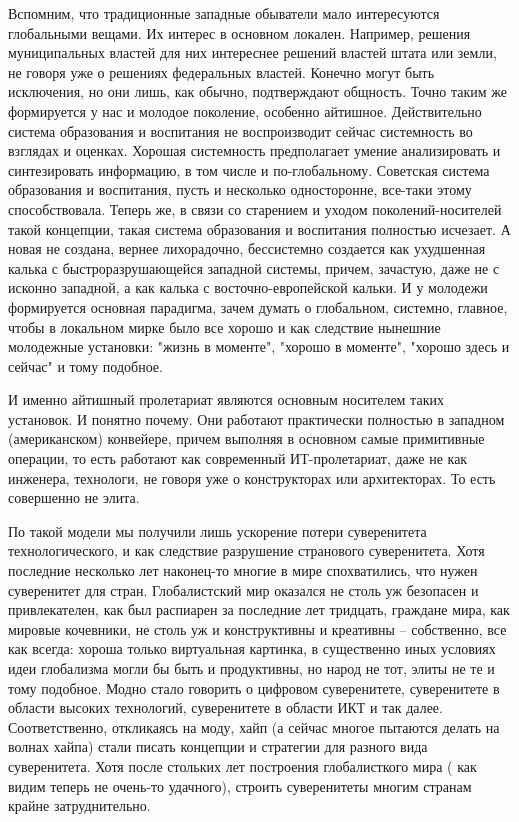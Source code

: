 Вспомним, что традиционные западные обыватели мало интересуются глобальными вещами. Их интерес в основном локален. Например, решения муниципальных властей для них интереснее решений властей штата или земли, не говоря уже о решениях федеральных властей. Конечно могут быть исключения, но они лишь, как обычно, подтверждают общность. Точно таким же формируется у нас и молодое поколение, особенно айтишное. Действительно система образования и воспитания не воспроизводит сейчас системность во взглядах и оценках. Хорошая системность предполагает умение анализировать и синтезировать информацию, в том числе и по-глобальному. Советская система образования и воспитания, пусть и несколько односторонне, все-таки этому способствовала. Теперь же, в связи со старением и уходом поколений-носителей такой концепции, такая система образования и воспитания полностью исчезает. А новая не создана, вернее лихорадочно, бессистемно создается как ухудшенная калька с быстроразрушающейся западной системы, причем, зачастую, даже не с исконно западной, а как калька с восточно-европейской  кальки. И у молодежи формируется основная парадигма, зачем думать о глобальном, системно, главное, чтобы в локальном мирке было все хорошо и как следствие нынешние молодежные установки: "жизнь в моменте"{}, "хорошо в моменте"{}, "хорошо здесь и сейчас"{} и тому подобное.

И именно айтишный пролетариат являются основным носителем таких установок.  И понятно почему. Они работают практически полностью в западном (американском) конвейере, причем выполняя в основном самые примитивные операции, то есть работают как современный ИТ-пролетариат, даже не как инженера, технологи, не говоря уже о конструкторах или архитекторах. То есть совершенно не элита.

По такой модели мы получили лишь ускорение потери суверенитета технологического, и как следствие разрушение странового суверенитета. 
Хотя последние несколько лет наконец-то многие в мире спохватились, что нужен суверенитет для стран. Глобалистский мир оказался не столь уж безопасен и привлекателен, как был распиарен за последние лет тридцать, граждане мира, как мировые кочевники, не столь уж и конструктивны и креативны -- собственно, все как всегда: хороша только виртуальная картинка,  в существенно иных условиях идеи глобализма могли бы быть и продуктивны, но народ не тот, элиты не те и тому подобное.  Модно стало говорить о цифровом суверенитете, суверенитете в области высоких технологий, суверенитете в области ИКТ и так далее. Соответственно, откликаясь на моду, хайп (а сейчас многое пытаются делать на волнах хайпа) стали писать концепции и стратегии для разного вида суверенитета. Хотя после стольких лет построения глобалисткого мира ( как видим теперь не очень-то  удачного),  строить суверенитеты многим странам крайне затруднительно.

